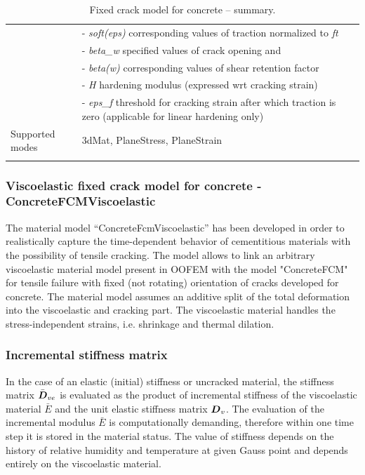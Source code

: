 \documentclass[a4paper]{article}
\newcommand{\mbf}[1]{\mbox{\boldmath$#1$}}
\newcommand{\param}[1]{{\it #1}}
\begin{document}
\begin{longtable}{|l|p{9cm}|}
&- \param{soft(eps)} corresponding values of traction normalized to \param{ft}\\
&- \param{beta\_w} specified values of crack opening and \\
&- \param{beta(w)} corresponding values of shear retention factor\\
&- \param{H} hardening modulus (expressed wrt cracking strain)\\
&- \param{eps\_f} threshold for cracking strain after which traction is zero (applicable for linear hardening only) \\
Supported modes& 3dMat, PlaneStress, PlaneStrain\\
\hline
\caption{Fixed crack model for concrete -- summary.}
\label{concrete_fcm_table}
\end{longtable}


\subsubsection{Viscoelastic fixed crack model for concrete - ConcreteFCMViscoelastic}
\label{concreteFCMViscoelastic}

The material model ``ConcreteFcmViscoelastic'' has been developed in order to
realistically capture the time-dependent behavior of cementitious materials
with the possibility of tensile cracking.
The model allows to link an arbitrary
viscoelastic material model present in OOFEM with the model "ConcreteFCM" for
tensile failure with fixed (not rotating) orientation of cracks
developed for concrete. The material model assumes an additive split of the total deformation
into the viscoelastic and cracking part. The viscoelastic material handles the
stress-independent strains, i.e. shrinkage and thermal dilation.

\subsubsection*{Incremental stiffness matrix}
In the case of an elastic (initial) stiffness or uncracked material, the
stiffness matrix $\bar{\mbf{D}}_{ve}$ is evaluated as the product of incremental stiffness of the
viscoelastic material $\bar{E}$ and the unit elastic
stiffness matrix $\mbf{D}_v$.
The evaluation of the incremental modulus $\bar{E}$ is
computationally demanding, therefore within one time step it is stored
in the material status. The value of stiffness depends on the history
  of relative humidity and temperature at given Gauss point and
  depends entirely on the viscoelastic material.
\end{document}
